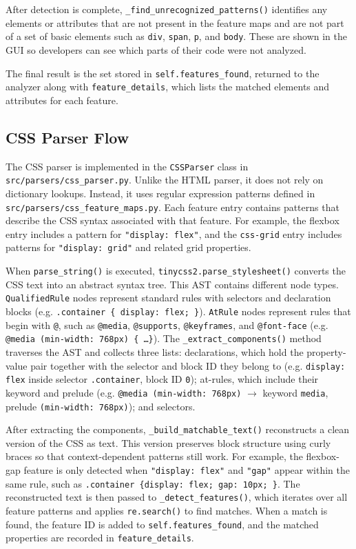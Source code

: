 After detection is complete, \texttt{\_find\_unrecognized\_patterns()} identifies any elements or attributes that are not present in the feature maps and are not part of a set of basic elements such as \texttt{div}, \texttt{span}, \texttt{p}, and \texttt{body}. These are shown in the GUI so developers can see which parts of their code were not analyzed.

The final result is the set stored in \texttt{self.features\_found}, returned to the analyzer along with \texttt{feature\_details}, which lists the matched elements and attributes for each feature.

\subsection{CSS Parser Flow}

The CSS parser is implemented in the \texttt{CSSParser} class in \texttt{src/parsers/css\_parser.py}. Unlike the HTML parser, it does not rely on dictionary lookups. Instead, it uses regular expression patterns defined in \texttt{src/parsers/css\_feature\_maps.py}. Each feature entry contains patterns that describe the CSS syntax associated with that feature. For example, the flexbox entry includes a pattern for \texttt{"display: flex"}, and the \texttt{css-grid} entry includes patterns for \texttt{"display: grid"} and related grid properties.

When \texttt{parse\_string()} is executed, \texttt{tinycss2.parse\_stylesheet()} converts the CSS text into an abstract syntax tree. This AST contains different node types. \texttt{QualifiedRule} nodes represent standard rules with selectors and declaration blocks (e.g. \texttt{.container \{ display: flex; \}}). \texttt{AtRule} nodes represent rules that begin with \texttt{@}, such as \texttt{@media}, \texttt{@supports}, \texttt{@keyframes}, and \texttt{@font-face} (e.g. \texttt{@media (min-width: 768px) \{ \ldots \}}). The \texttt{\_extract\_components()} method traverses the AST and collects three lists: declarations, which hold the property-value pair together with the selector and block ID they belong to (e.g. \texttt{display: flex} inside selector \texttt{.container}, block ID \texttt{0}); at-rules, which include their keyword and prelude (e.g. \texttt{@media (min-width: 768px)} $\to$ keyword \texttt{media}, prelude \texttt{(min-width: 768px)}); and selectors.

After extracting the components, \texttt{\_build\_matchable\_text()} reconstructs a clean version of the CSS as text. This version preserves block structure using curly braces so that context-dependent patterns still work. For example, the flexbox-gap feature is only detected when \texttt{"display: flex"} and \texttt{"gap"} appear within the same rule, such as \texttt{.container \{display: flex; gap: 10px; \}}. The reconstructed text is then passed to \texttt{\_detect\_features()}, which iterates over all feature patterns and applies \texttt{re.search()} to find matches. When a match is found, the feature ID is added to \texttt{self.features\_found}, and the matched properties are recorded in \texttt{feature\_details}.

